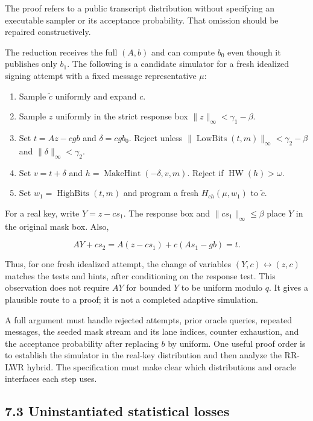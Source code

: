 \documentclass[
  american,
  10pt,
  a4paper,
]{article}
\providecommand{\tightlist}{%
  \setlength{\itemsep}{0pt}\setlength{\parskip}{0pt}}
\begin{document}
The proof refers to a public transcript distribution without specifying
an executable sampler or its acceptance probability. That omission
should be repaired constructively.

The reduction receives the full \((A,b)\) and can compute \(b_0\) even
though it publishes only \(b_1\). The following is a candidate simulator
for a fresh idealized signing attempt with a fixed message
representative \(\mu\):

\begin{enumerate}
\def\labelenumi{\arabic{enumi}.}
\tightlist
\item
  Sample \(\widetilde c\) uniformly and expand \(c\).
\item
  Sample \(z\) uniformly in the strict response box
  \(\|z\|_\infty<\gamma_1-\beta\).
\item
  Set \(t=Az-cgb\) and \(\delta=cgb_0\). Reject unless
  \(\|\operatorname{LowBits}(t,m)\|_\infty<\gamma_2-\beta\) and
  \(\|\delta\|_\infty<\gamma_2\).
\item
  Set \(v=t+\delta\) and \(h=\operatorname{MakeHint}(-\delta,v,m)\).
  Reject if \(\operatorname{HW}(h)>\omega\).
\item
  Set \(w_1=\operatorname{HighBits}(t,m)\) and program a fresh
  \(H_{ch}(\mu,w_1)\) to \(\widetilde c\).
\end{enumerate}

For a real key, write \(Y=z-cs_1\). The response box and
\(\|cs_1\|_\infty\leq\beta\) place \(Y\) in the original mask box. Also,

\[
AY+cs_2=A(z-cs_1)+c(As_1-gb)=t.
\]

Thus, for one fresh idealized attempt, the change of variables
\((Y,c)\leftrightarrow(z,c)\) matches the tests and hints, after
conditioning on the response test. This observation does not require
\(AY\) for bounded \(Y\) to be uniform modulo \(q\). It gives a
plausible route to a proof; it is not a completed adaptive simulation.

A full argument must handle rejected attempts, prior oracle queries,
repeated messages, the seeded mask stream and its lane indices, counter
exhaustion, and the acceptance probability after replacing \(b\) by
uniform. One useful proof order is to establish the simulator in the
real-key distribution and then analyze the RR-LWR hybrid. The
specification must make clear which distributions and oracle interfaces
each step uses.

\subsection{7.3 Uninstantiated statistical
losses}\label{uninstantiated-statistical-losses}
\end{document}
